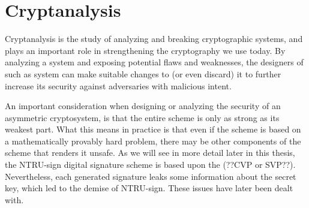 
\section{Cryptanalysis}
Cryptanalysis is the study of analyzing and breaking cryptographic systems, and plays an important role in strengthening the cryptography we use today.
By analyzing a system and exposing potential flaws and weaknesses, the designers of such as system can make suitable changes to (or even discard) it to further increase its security against adversaries with malicious intent.

An important consideration when designing or analyzing the security of an asymmetric cryptosystem, is that the entire scheme is only as strong as its weakest part. 
What this means in practice is that even if the scheme is based on a mathematically provably hard problem, there may be other components of the scheme that renders it unsafe.
As we will see in more detail later in this thesis, the NTRU-sign digital signature scheme is based upon the (??CVP or SVP??). Nevertheless, each generated signature leaks some information about the secret key, which led to the demise of
NTRU-sign. These issues have later been dealt with.

